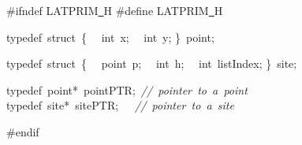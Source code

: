 {\ttfamily \raggedright \footnotesize
\#ifndef LATPRIM\underline\ H
\#define LATPRIM\underline\ H

typedef\ struct\ \{
\ \ int\ x;
\ \ int\ y;
\}\ point;

typedef\ struct\ \{
\ \ point\ p;
\ \ int\ h;
\ \ int\ listIndex;
\}\ site;

typedef\ point*\ pointPTR;\ \textsl{//\ pointer\ to\ a\ point}
typedef\ site*\ sitePTR;\ \ \ \textsl{//\ pointer\ to\ a\ site}

\#endif

 }
\normalfont\normalsize

